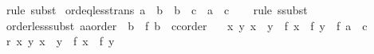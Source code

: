 \begin{isabellebody}
\ {\isacharparenleft}{\kern0pt}rule\ subst{\isacharparenright}{\kern0pt}%
\endisatagproof
{\isafoldproof}%
%
\isadelimproof
\isanewline
%
\endisadelimproof
\isanewline
{}\isamarkupfalse%
\ ord{\isacharunderscore}{\kern0pt}eq{\isacharunderscore}{\kern0pt}less{\isacharunderscore}{\kern0pt}trans{\isacharcolon}{\kern0pt}\ {\isachardoublequoteopen}a\ {\isacharequal}{\kern0pt}\ b\ {\isasymLongrightarrow}\ b\ {\isacharless}{\kern0pt}\ c\ {\isasymLongrightarrow}\ a\ {\isacharless}{\kern0pt}\ c{\isachardoublequoteclose}\isanewline
%
\isadelimproof
\ \ %
\endisadelimproof
%
\isatagproof
{}\isamarkupfalse%
\ {\isacharparenleft}{\kern0pt}rule\ ssubst{\isacharparenright}{\kern0pt}%
\endisatagproof
{\isafoldproof}%
%
\isadelimproof
\isanewline
%
\endisadelimproof
\isanewline
{}\isamarkupfalse%
\isanewline
\isanewline
{}\isamarkupfalse%
\ order{\isacharunderscore}{\kern0pt}less{\isacharunderscore}{\kern0pt}subst{}{\isacharcolon}{\kern0pt}\ {\isachardoublequoteopen}{\isacharparenleft}{\kern0pt}a{\isacharcolon}{\kern0pt}{\isacharcolon}{\kern0pt}{\isacharprime}{\kern0pt}a{\isacharcolon}{\kern0pt}{\isacharcolon}{\kern0pt}order{\isacharparenright}{\kern0pt}\ {\isacharless}{\kern0pt}\ b\ {\isacharequal}{\kern0pt}{\isacharequal}{\kern0pt}{\isachargreater}{\kern0pt}\ f\ b\ {\isacharless}{\kern0pt}\ {\isacharparenleft}{\kern0pt}c{\isacharcolon}{\kern0pt}{\isacharcolon}{\kern0pt}{\isacharprime}{\kern0pt}c{\isacharcolon}{\kern0pt}{\isacharcolon}{\kern0pt}order{\isacharparenright}{\kern0pt}\ {\isacharequal}{\kern0pt}{\isacharequal}{\kern0pt}{\isachargreater}{\kern0pt}\isanewline
\ \ {\isacharparenleft}{\kern0pt}{\isacharbang}{\kern0pt}{\isacharbang}{\kern0pt}x\ y{\isachardot}{\kern0pt}\ x\ {\isacharless}{\kern0pt}\ y\ {\isacharequal}{\kern0pt}{\isacharequal}{\kern0pt}{\isachargreater}{\kern0pt}\ f\ x\ {\isacharless}{\kern0pt}\ f\ y{\isacharparenright}{\kern0pt}\ {\isacharequal}{\kern0pt}{\isacharequal}{\kern0pt}{\isachargreater}{\kern0pt}\ f\ a\ {\isacharless}{\kern0pt}\ c{\isachardoublequoteclose}\isanewline
%
\isadelimproof
%
\endisadelimproof
%
\isatagproof
{}\isamarkupfalse%
\ {\isacharminus}{\kern0pt}\isanewline
\ \ \isamarkupfalse%
\ r{\isacharcolon}{\kern0pt}\ {\isachardoublequoteopen}{\isacharbang}{\kern0pt}{\isacharbang}{\kern0pt}x\ y{\isachardot}{\kern0pt}\ x\ {\isacharless}{\kern0pt}\ y\ {\isacharequal}{\kern0pt}{\isacharequal}{\kern0pt}{\isachargreater}{\kern0pt}\ f\ x\ {\isacharless}{\kern0pt}\ f\ y{\isachardoublequoteclose}\isanewline
\ \ \isamarkupfalse%

\end{isabellebody}
